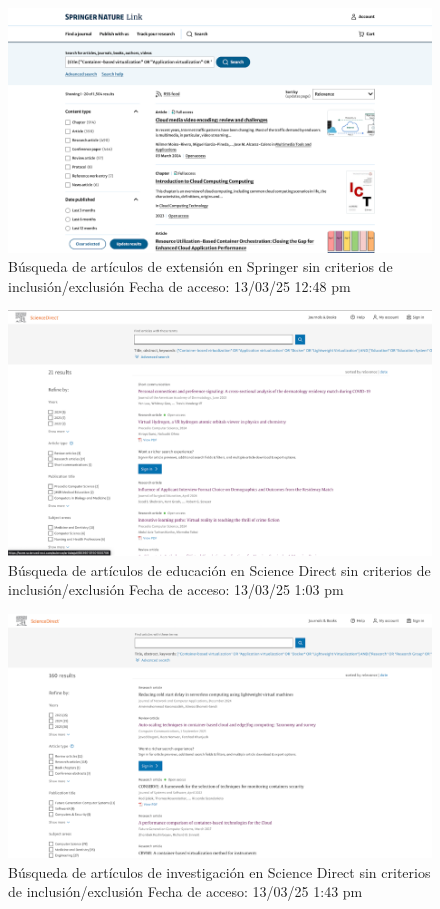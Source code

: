 \FloatBarrier\begin{figure}[H]
    \centering
    \includegraphics[width=\textwidth,keepaspectratio]{apendices/BD/sin-criterios/Springer-ind.png}
    \caption{Búsqueda de artículos de extensión en Springer sin criterios de inclusión/exclusión
    Fecha de acceso: 13/03/25 12:48 pm}
\end{figure}
\FloatBarrier\begin{figure}[H]
    \centering
    \includegraphics[width=\textwidth,keepaspectratio]{apendices/BD/sin-criterios/SD-ed.png}
    \caption{Búsqueda de artículos de educación en Science Direct sin criterios de inclusión/exclusión
    Fecha de acceso: 13/03/25 1:03 pm}
\end{figure}
\FloatBarrier\begin{figure}[H]
    \centering
    \includegraphics[width=\textwidth,keepaspectratio]{apendices/BD/sin-criterios/SD-inv.png}
    \caption{Búsqueda de artículos de investigación en Science Direct sin criterios de inclusión/exclusión
    Fecha de acceso: 13/03/25 1:43 pm}
\end{figure}
